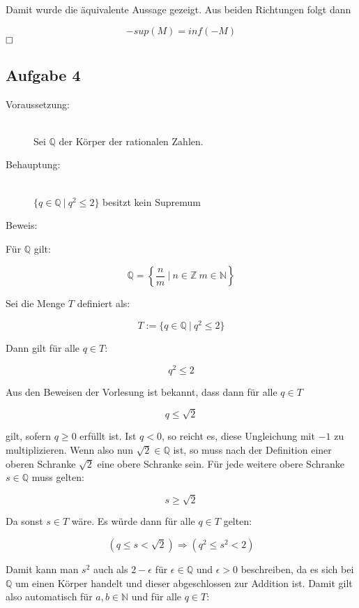 \documentclass[11pt, a4paper]{article}
\begin{document}
		Damit wurde die äquivalente Aussage gezeigt. Aus beiden Richtungen folgt dann 

		\[-sup(M) = inf(-M) \]
		 $\hfill\Box$
 

	\newpage

 	\subsection*{Aufgabe 4}

 		\begin{description}
			\item[Voraussetzung:] \hfill \\
				Sei $\mathbb{Q}$ der Körper der rationalen Zahlen. \hfill 
			\item[Behauptung:] \hfill \\
				$\{ q\in \mathbb{Q} \ | \ q^2 \leq 2 \}$ besitzt kein Supremum \hfill
			\item[Beweis:] 
		\end{description}

		Für $\mathbb{Q}$ gilt:

		\[ \mathbb{Q} = \left\{ \dfrac{n}{m} \ \vert \ n \in \mathbb{Z} \ m \in \mathbb{N} \right\} \]

		Sei die Menge $T$ definiert als:

		\[ T := \{ q\in \mathbb{Q} \ | \ q^2 \leq 2 \} \]

		Dann gilt für alle $q \in T$:

		\[ q^2 \leq 2 \]

		Aus den Beweisen der Vorlesung ist bekannt, dass dann  für alle $q \in T$

		\[ q \leq \sqrt{2} \]

		gilt, sofern $q \geq 0$ erfüllt ist. Ist  $q < 0$, so reicht es, diese Ungleichung mit $-1$ zu multiplizieren.
		Wenn also nun $\sqrt{2} \in \mathbb{Q}$ ist, so muss nach der Definition einer oberen Schranke $\sqrt{2}$ eine obere Schranke sein.
		Für jede weitere obere Schranke $s \in \mathbb{Q}$ muss gelten:

		\[ s \geq \sqrt{2} \]

		Da sonst $s \in T$ wäre. Es würde dann für alle $q \in T$ gelten:

		\[ (q \leq s < \sqrt{2}) \Rightarrow (q^2 \leq s^2 < 2) \]

		Damit kann man $s^2$ auch als $2-\epsilon$ für $\epsilon \in \mathbb{Q}$ und $\epsilon > 0$ beschreiben, da es sich bei $\mathbb{Q}$ um einen Körper handelt und dieser abgeschlossen zur Addition ist.
		Damit gilt also automatisch für $a,b \in \mathbb{N}$ und für alle $q \in T$:
\end{document}
